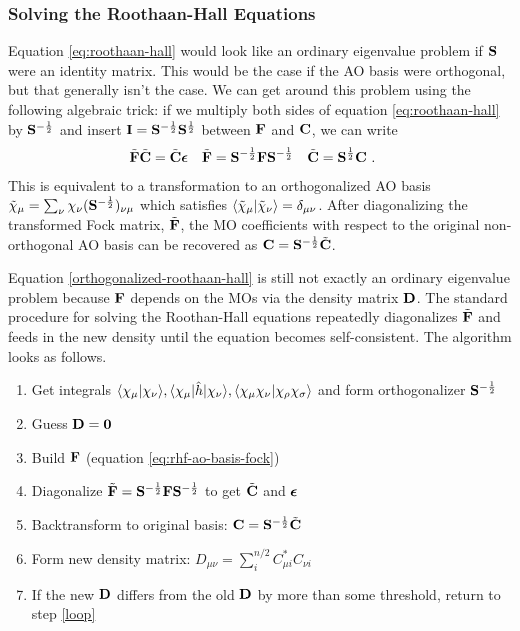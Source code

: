 \documentclass[11pt]{article}
\numberwithin{equation}{section}
\begin{document}
\subsubsection{Solving the Roothaan-Hall Equations}

Equation \ref{eq:roothaan-hall} would look like an ordinary eigenvalue problem if $\mathbf{S}$ were an identity matrix.
This would be the case if the AO basis were orthogonal, but that generally isn't the case.
We can get around this problem using the following algebraic trick:
if we multiply both sides of equation \ref{eq:roothaan-hall} by $\mathbf{S}^{-\frac{1}{2}}$ and insert $\mathbf{I}=\mathbf{S}^{-\frac{1}{2}}\mathbf{S}^{\frac{1}{2}}$ between $\mathbf{F}$ and $\mathbf{C}$, we can write
\begin{align}
\label{orthogonalized-roothaan-hall}
&
  \tl{\bo{F}}
  \tl{\bo{C}}
=
  \tl{\bo{C}}\bm\ev
&&
  \tl{\bo{F}}
=
  \bo{S}^{-\frac{1}{2}}\bo{F}\bo{S}^{-\frac{1}{2}}
&&
  \tl{\bo{C}}
=
  \bo{S}^{\frac{1}{2}}\bo{C}\ .
\end{align}
This is equivalent to a transformation to an orthogonalized AO basis $\tl\x_\mu=\sum_\nu\x_\nu (\bo{S}^{-\frac{1}{2}})_{\nu\mu}$ which satisfies $\ip{\tl\x_\mu|\tl\x_\nu}=\d_{\mu\nu}$.
After diagonalizing the transformed Fock matrix, $\tilde{\mathbf{F}}$, the MO coefficients with respect to the original non-orthogonal AO basis can be recovered as $\mathbf{C}=\mathbf{S}^{-\frac{1}{2}}\tilde{\mathbf{C}}$.

\begin{samepage}
Equation \ref{orthogonalized-roothaan-hall} is still not exactly an ordinary eigenvalue problem because $\mathbf{F}$ depends on the MOs via the density matrix $\mathbf{D}$.
The standard procedure for solving the Roothan-Hall equations repeatedly diagonalizes $\tilde{\mathbf{F}}$ and feeds in the new density until the equation becomes self-consistent.
The algorithm looks as follows.
\begin{enumerate}
  \item Get integrals $\ip{\x_\mu|\x_\nu}, \ip{\x_\mu|\op{h}|\x_\nu}, \ip{\x_\mu\x_\nu|\x_\rho\x_\si}$ and form orthogonalizer $\mathbf{S}^{-\frac{1}{2}}$
  \item Guess $\mathbf{D}=\mathbf{0}$
  \item\label{loop} Build $\mathbf{F}$ (equation \ref{eq:rhf-ao-basis-fock})
  \item Diagonalize $\tilde{\mathbf{F}}=\mathbf{S}^{-\frac{1}{2}}\mathbf{F}\mathbf{S}^{-\frac{1}{2}}$ to get $\tilde{\mathbf{C}}$ and $\bm\ev$
  \item Backtransform to original basis: $\mathbf{C}=\mathbf{S}^{-\frac{1}{2}}\tilde{\mathbf{C}}$
  \item Form new density matrix: $D_{\mu\nu}=\sum_i^{n/2} C_{\mu i}^*C_{\nu i}$
  \item If the new $\mathbf{D}$ differs from the old $\mathbf{D}$ by more than some threshold, return to step \ref{loop}
\end{enumerate}
\end{samepage}
\end{document}
